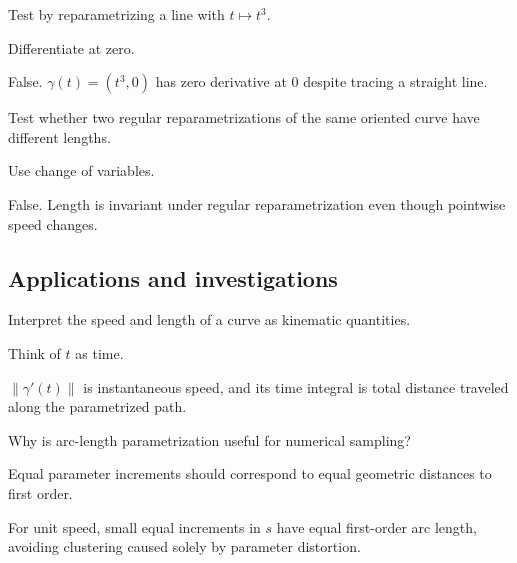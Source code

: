 \begin{exercise}\label{exr:vii12-ped-11}
Test by reparametrizing a line with \(t\mapsto t^3\).
\end{exercise}
\begin{hint}
Differentiate at zero.
\end{hint}
\begin{solution}
False.  \(\gamma(t)=(t^3,0)\) has zero derivative at \(0\) despite tracing a straight line.
\end{solution}

\begin{exercise}\label{exr:vii12-ped-12}
Test whether two regular reparametrizations of the same oriented curve have different lengths.
\end{exercise}
\begin{hint}
Use change of variables.
\end{hint}
\begin{solution}
False.  Length is invariant under regular reparametrization even though pointwise speed changes.
\end{solution}

\subsection*{Applications and investigations}

\begin{exercise}\label{exr:vii12-ped-13}
Interpret the speed and length of a curve as kinematic quantities.
\end{exercise}
\begin{hint}
Think of \(t\) as time.
\end{hint}
\begin{solution}
\(\|\gamma'(t)\|\) is instantaneous speed, and its time integral is total distance traveled along the parametrized path.
\end{solution}

\begin{exercise}\label{exr:vii12-ped-14}
Why is arc-length parametrization useful for numerical sampling?
\end{exercise}
\begin{hint}
Equal parameter increments should correspond to equal geometric distances to first order.
\end{hint}
\begin{solution}
For unit speed, small equal increments in \(s\) have equal first-order arc length, avoiding clustering caused solely by parameter distortion.
\end{solution}

